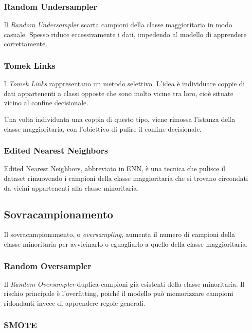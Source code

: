 \documentclass[11pt, a4paper]{article}
\begin{document}
\subsubsection{Random Undersampler}

Il \emph{Random Undersampler} scarta campioni della classe maggioritaria in modo
casuale. Spesso riduce eccessivamente i dati, impedendo al modello di apprendere
correttamente.

\subsubsection{Tomek Links}

I \emph{Tomek Links} rappresentano un metodo selettivo. L'idea è individuare
coppie di dati appartenenti a classi opposte che sono molto vicine tra loro,
cioè situate vicino al confine decisionale.

Una volta individuata una coppia di questo tipo, viene rimossa l'istanza della
classe maggioritaria, con l'obiettivo di pulire il confine decisionale.

\subsubsection{Edited Nearest Neighbors}

Edited Nearest Neighbors, abbreviato in ENN, è una tecnica che pulisce il dataset
rimuovendo i campioni della classe maggioritaria che si trovano circondati da
vicini appartenenti alla classe minoritaria.

\subsection{Sovracampionamento}

Il sovracampionamento, o \emph{oversampling}, aumenta il numero di campioni della
classe minoritaria per avvicinarlo o eguagliarlo a quello della classe
maggioritaria.

\subsubsection{Random Oversampler}

Il \emph{Random Oversampler} duplica campioni già esistenti della classe
minoritaria. Il rischio principale è l'overfitting, poiché il modello può
memorizzare campioni ridondanti invece di apprendere regole generali.

\subsubsection{SMOTE}
\end{document}
